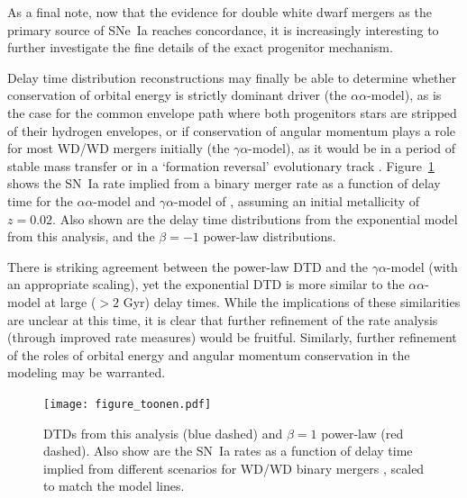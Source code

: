 \documentclass[apj, linenumbers]{aastex62}
\begin{document}
As a final note, now that the evidence for double white dwarf mergers as the primary source of SNe~Ia reaches concordance, it is increasingly interesting to further investigate the fine details of the exact progenitor mechanism. 

Delay time distribution reconstructions may finally be able to determine whether conservation of orbital energy is strictly dominant driver (the $\alpha\alpha$-model), as is the case for the common envelope path where both progenitors stars are stripped of their hydrogen envelopes, or if conservation of angular momentum plays a role for most WD/WD mergers initially (the $\gamma\alpha$-model), as it would be in a period of stable mass transfer or in a `formation reversal' evolutionary track \citep{Toonen:2013le}. Figure~\ref{fig:toonen} shows the SN~Ia rate implied from a binary merger rate as a function of delay time for the $\alpha\alpha$-model and $\gamma\alpha$-model of \cite{Toonen:2013ng}, assuming an initial metallicity of $z=0.02$. Also shown are the delay time distributions from the exponential model from this analysis, and the $\beta=-1$ power-law distributions. 

There is striking agreement between the power-law DTD and the $\gamma\alpha$-model (with an appropriate scaling), yet the exponential DTD is more similar to the $\alpha\alpha$-model at large ($>2$ Gyr) delay times. While the implications of these similarities are unclear at this time, it is clear that further refinement of the rate analysis (through improved rate measures) would be fruitful. Similarly, further refinement of the roles of orbital energy and angular momentum conservation in the modeling may be warranted. 

\begin{figure}[t] 
   \centering
   \texttt{[image: figure\_toonen.pdf]}
   \caption{\footnotesize DTDs from this analysis (blue dashed) and $\beta=1$ power-law (red dashed). Also show are the SN~Ia rates as a function of delay time implied from different scenarios for WD/WD binary mergers \citep[see][]{Toonen:2013ng}, scaled to match the model lines. }
   \label{fig:toonen}
\end{figure}
\end{document}
